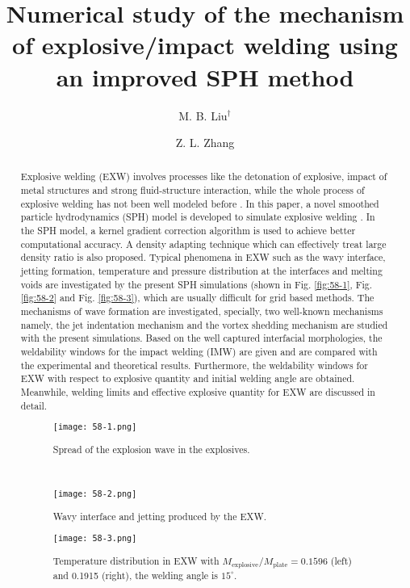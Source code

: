 \documentclass[10pt]{article}
\title{Numerical study of the mechanism of explosive/impact welding using an improved SPH method}
\date{}
\author[1,2]{M. B. Liu$^\dagger$}
\author[1]{Z. L. Zhang}
\affil[1]{BIC-ESAT, College of Engineering, Peking University, Beijing 100187, China}
\affil[2]{State Key Laboratory for Turbulence and Complex Systems, Peking University, Beijing 100871, China}
\affil[$\relax$]{\email{\dagger}{mbliu@pku.edu.cn}}
\begin{document}
\maketitle


\begin{abstract}
Explosive welding (EXW) involves processes like the detonation of explosive, impact of metal structures and strong fluid-structure interaction, while the whole process of explosive welding has not been well modeled before \cite{mousavi2005numerical}. In this paper, a novel smoothed particle hydrodynamics (SPH) model is developed to simulate explosive welding \cite{liu2010smoothed,liu2017density}. In the SPH model, a kernel gradient correction algorithm is used to achieve better computational accuracy. A density adapting technique which can effectively treat large density ratio is also proposed. Typical phenomena in EXW such as the wavy interface, jetting formation, temperature and pressure distribution at the interfaces and melting voids are investigated by the present SPH simulations (shown in Fig. \ref{fig:58-1}, Fig. \ref{fig:58-2} and Fig. \ref{fig:58-3}), which are usually difficult for grid based methods. The mechanisms of wave formation are investigated, specially, two well-known mechanisms namely, the jet indentation mechanism and the vortex shedding mechanism are studied with the present simulations. Based on the well captured interfacial morphologies, the weldability windows for the impact welding (IMW) are given and are compared with the experimental and theoretical results. Furthermore, the weldability windows for EXW with respect to explosive quantity and initial welding angle are obtained. Meanwhile, welding limits and effective explosive quantity for EXW are discussed in detail.


\begin{figure}[!htb]
\begin{minipage}[t]{0.46\linewidth}
\centering
\texttt{[image: 58-1.png]}
\caption{Spread of the explosion wave in the explosives.}\label{fig:58-1}
\end{minipage}
\begin{minipage}[t]{0.05\linewidth}
~~
\end{minipage}
\begin{minipage}[t]{0.46\linewidth}
\centering
\texttt{[image: 58-2.png]}
\caption{Wavy interface and jetting produced by the EXW.}\label{fig:58-2}
\end{minipage}
\end{figure}

\begin{figure}[!htb]
\centering
\texttt{[image: 58-3.png]}
\caption{Temperature distribution in EXW with $M_\text{explosive}/M_\text{plate} = 0.1596$ (left) and 0.1915 (right), the welding angle is $15^\circ$.}\label{fig:58-3}
\end{figure}

\end{abstract}



\addbib
\end{document}
